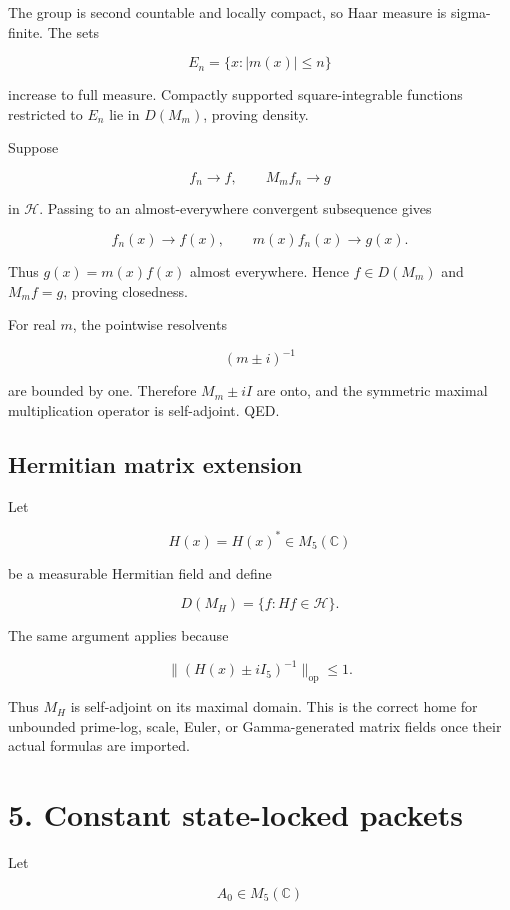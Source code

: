 The group is second countable and locally compact, so Haar measure is
sigma-finite. The sets

\[
E_n=\{x:|m(x)|\le n\}
\]

increase to full measure. Compactly supported square-integrable functions
restricted to \(E_n\) lie in \(D(M_m)\), proving density.

Suppose

\[
f_n\to f,
\qquad
M_mf_n\to g
\]

in \(\mathcal H\). Passing to an almost-everywhere convergent subsequence gives

\[
f_n(x)\to f(x),
\qquad
m(x)f_n(x)\to g(x).
\]

Thus \(g(x)=m(x)f(x)\) almost everywhere. Hence \(f\in D(M_m)\) and
\(M_mf=g\), proving closedness.

For real \(m\), the pointwise resolvents

\[
(m\pm i)^{-1}
\]

are bounded by one. Therefore \(M_m\pm iI\) are onto, and the symmetric maximal
multiplication operator is self-adjoint. QED.

\hypertarget{hermitian-matrix-extension}{%
\subsection{Hermitian matrix extension}\label{hermitian-matrix-extension}}

Let

\[
H(x)=H(x)^*\in M_5(\mathbb C)
\]

be a measurable Hermitian field and define

\[
D(M_H)=\{f:Hf\in\mathcal H\}.
\]

The same argument applies because

\[
\|(H(x)\pm iI_5)^{-1}\|_{\mathrm{op}}\le1.
\]

Thus \(M_H\) is self-adjoint on its maximal domain. This is the correct home
for unbounded prime-log, scale, Euler, or Gamma-generated matrix fields once
their actual formulas are imported.

\hypertarget{constant-state-locked-packets}{%
\section{5. Constant state-locked packets}\label{constant-state-locked-packets}}

Let

\[
A_0\in M_5(\mathbb C)
\]


